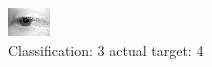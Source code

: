 \begin{figure}[h!]
\begin{center}
\includegraphics[width=0.60\columnwidth]{figures/ID2649_class_3_target_4.png}
\end{center}
\caption{ Classification: 3 actual target: 4}
\label{fig:ID2649_class_3_target_4}
\end{figure}
